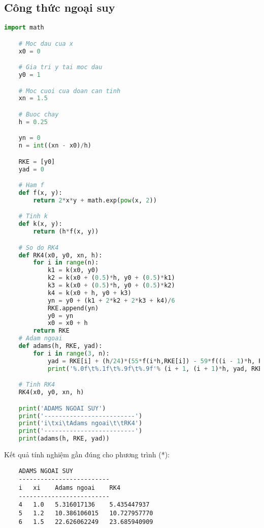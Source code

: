 \subsection{Công thức ngoại suy}
\begin{lstlisting}[language=Python]
	import math

	# Moc dau cua x
	x0 = 0

	# Gia tri y tai moc dau
	y0 = 1

	# Moc cuoi cua doan can tinh
	xn = 1.5

	# Buoc chay
	h = 0.25

	yn = 0
	n = int((xn - x0)/h)

	RKE = [y0]
	yad = 0

	# Ham f
	def f(x, y):
	    return 2*x*y + math.exp(pow(x, 2))

	# Tinh k
	def k(x, y):
		return (h*f(x, y))

	# So do RK4
	def RK4(x0, y0, xn, h):
	    for i in range(n):
	        k1 = k(x0, y0)
	        k2 = k(x0 + (0.5)*h, y0 + (0.5)*k1)
	        k3 = k(x0 + (0.5)*h, y0 + (0.5)*k2)
	        k4 = k(x0 + h, y0 + k3)
	        yn = y0 + (k1 + 2*k2 + 2*k3 + k4)/6
	        RKE.append(yn)
	        y0 = yn
	        x0 = x0 + h
	    return RKE
	# Adam ngoai
	def adams(h, RKE, yad):
		for i in range(3, n):
			yad = RKE[i] + (h/24)*(55*f(i*h,RKE[i]) - 59*f((i - 1)*h, RKE[i - 1]) + 37*f((i - 2)*h, RKE[i - 2]) - 9*f((i - 3)*h, RKE[i - 3]))
			print('%.0f\t%.1f\t%.9f\t%.9f'% (i + 1, (i + 1)*h, yad, RKE[i + 1]))

	# Tinh RK4
	RK4(x0, y0, xn, h)

	print('ADAMS NGOAI SUY')
	print('-------------------------')    
	print('i\txi\tAdams ngoai\t\tRK4')
	print('-------------------------')
	print(adams(h, RKE, yad))
\end{lstlisting}

Kết quả tính nghiệm gần đúng cho phương trình (*):
\begin{lstlisting}
	ADAMS NGOAI SUY
	-------------------------
	i   xi    Adams ngoai    RK4
	-------------------------
	4   1.0   5.316017136    5.435447937
	5   1.2   10.386106015   10.727957770
	6   1.5   22.626062249   23.685940909
\end{lstlisting}
